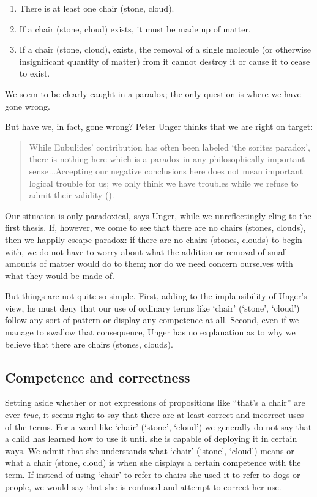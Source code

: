\documentclass[11pt]{article}
\newenvironment{squote}{%
	\begin{quote}\begin{singlespace}%
	}{%
	\end{singlespace}\end{quote}}
\begin{document}
\begin{spacing}{1.5}
\begin{enumerate}
  \item There is at least one chair (stone, cloud).
  \item If a chair (stone, cloud) exists, it must be made up of
    matter.
  \item If a chair (stone, cloud), exists, the removal of a single
    molecule (or otherwise insignificant quantity of matter) from it
    cannot destroy it or cause it to cease to exist.
\end{enumerate}

We seem to be clearly caught in a paradox; the only question is where
we have gone wrong.

But have we, in fact, gone wrong?  Peter Unger thinks that we are
right on target:

\begin{squote}
While Eubulides' contribution has often been labeled `the sorites
paradox', there is nothing here which is a paradox in any
philosophically important sense\,\ldots Accepting our negative
conclusions here does not mean important logical trouble for us; we
only think we have troubles while we refuse to admit their validity
(\citeyear[145]{unger1979}).
\end{squote}

Our situation is only paradoxical, says Unger, while we unreflectingly
cling to the first thesis.  If, however, we come to see that there are
no chairs (stones, clouds), then we happily escape paradox: if there
are no chairs (stones, clouds) to begin with, we do not have to worry
about what the addition or removal of small amounts of matter would do
to them; nor do we need concern ourselves with what they would be made
of.

But things are not quite so simple.  First, adding to the
implausibility of Unger's view, he must deny that our use of ordinary
terms like `chair' (`stone', `cloud') follow any sort of pattern or
display any competence at all.  Second, even if we manage to swallow
that consequence, Unger has no explanation as to why we believe that
there are chairs (stones, clouds).

\subsection{Competence and correctness}
\label{correct}
Setting aside whether or not expressions of propositions like ``that's
a chair'' are ever \emph{true}, it seems right to say that there are
at least correct and incorrect uses of the terms.  For a word like
`chair' (`stone', `cloud') we generally do not say that a child has
learned how to use it until she is capable of deploying it in certain
ways.  We admit that she understands what `chair' (`stone', `cloud')
means or what a chair (stone, cloud) is when she displays a certain
competence with the term.  If instead of using `chair' to refer to
chairs she used it to refer to dogs or people, we would say that she
is confused and attempt to correct her use.


\end{spacing}
\end{document}

